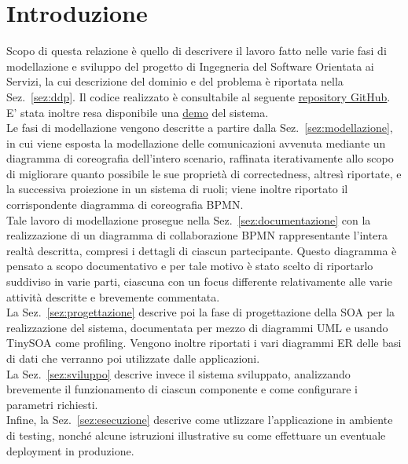 \documentclass[11pt]{article} %
\begin{document}
\clearpage
\tableofcontents
\thispagestyle{empty}
\newpage

\section{Introduzione}

Scopo di questa relazione è quello di descrivere il lavoro fatto nelle varie fasi di modellazione e sviluppo del progetto di Ingegneria del Software Orientata ai Servizi, la cui descrizione del dominio e del problema è riportata nella Sez.~\ref{sez:ddp}. Il codice realizzato è consultabile al seguente \href{https://github.com/CodingCoyotes/ACMEat}{repository GitHub}. E' stata inoltre resa disponibile una \href{https://codingcoyotes.github.io/ACMEat_Index/}{demo} del sistema.\\
Le fasi di modellazione vengono descritte a partire dalla Sez.~\ref{sez:modellazione}, in cui viene esposta la modellazione delle comunicazioni avvenuta mediante un diagramma di coreografia dell'intero scenario, raffinata iterativamente allo scopo di migliorare quanto possibile le sue proprietà di correctedness, altresì riportate, e la successiva proiezione in un sistema di ruoli; viene inoltre riportato il corrispondente diagramma di coreografia BPMN.\\
Tale lavoro di modellazione prosegue nella Sez.~\ref{sez:documentazione} con la realizzazione di un diagramma di collaborazione BPMN rappresentante l'intera realtà descritta, compresi i dettagli di ciascun partecipante. Questo diagramma è pensato a scopo documentativo e per tale motivo è stato scelto di riportarlo suddiviso in varie parti, ciascuna con un focus differente relativamente alle varie attività descritte e brevemente commentata.\\
La Sez.~\ref{sez:progettazione} descrive poi la fase di progettazione della SOA per la realizzazione del sistema, documentata per mezzo di diagrammi UML e usando TinySOA come profiling. Vengono inoltre riportati i vari diagrammi ER delle basi di dati che verranno poi utilizzate dalle applicazioni.\\
La Sez.~\ref{sez:sviluppo} descrive invece il sistema sviluppato, analizzando brevemente il funzionamento di ciascun componente e come configurare i parametri richiesti.\\
Infine, la Sez.~\ref{sez:esecuzione} descrive come utlizzare l'applicazione in ambiente di testing, nonché alcune istruzioni illustrative su come effettuare un eventuale deployment in produzione.
\end{document}
